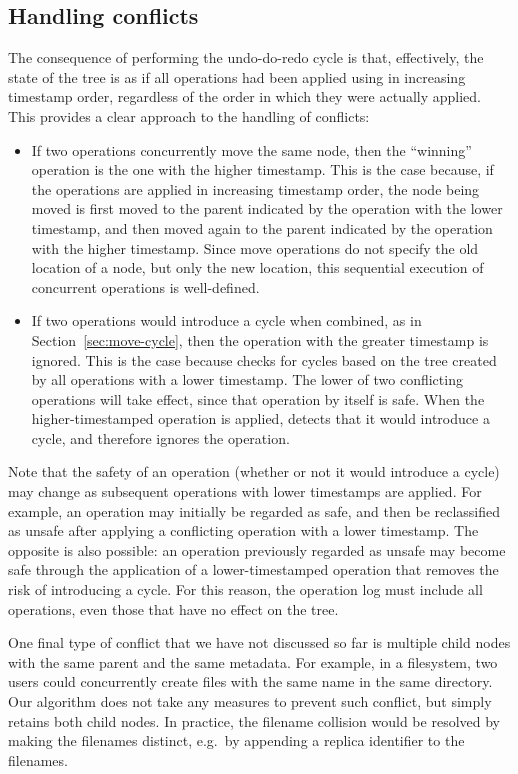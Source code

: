 \documentclass[sigconf]{acmart}
\begin{document}
\subsection{Handling conflicts}\label{sec:conflicts}

The consequence of performing the undo-do-redo cycle is that, effectively, the state of the tree is as if all operations had been applied using  in increasing timestamp order, regardless of the order in which they were actually applied.
This provides a clear approach to the handling of conflicts:
\begin{itemize}
    \item If two operations concurrently move the same node, then the ``winning'' operation is the one with the higher timestamp.
        This is the case because, if the operations are applied in increasing timestamp order, the node being moved is first moved to the parent indicated by the operation with the lower timestamp, and then moved again to the parent indicated by the operation with the higher timestamp.
        Since move operations do not specify the old location of a node, but only the new location, this sequential execution of concurrent operations is well-defined.
    \item If two operations would introduce a cycle when combined, as in Section~\ref{sec:move-cycle}, then the operation with the greater timestamp is ignored.
        This is the case because  checks for cycles based on the tree created by all operations with a lower timestamp.
        The lower of two conflicting operations will take effect, since that operation by itself is safe.
        When the higher-timestamped operation is applied,  detects that it would introduce a cycle, and therefore ignores the operation.
\end{itemize}

Note that the safety of an operation (whether or not it would introduce a cycle) may change as subsequent operations with lower timestamps are applied.
For example, an operation may initially be regarded as safe, and then be reclassified as unsafe after applying a conflicting operation with a lower timestamp.
The opposite is also possible: an operation previously regarded as unsafe may become safe through the application of a lower-timestamped operation that removes the risk of introducing a cycle.
For this reason, the operation log must include all operations, even those that have no effect on the tree.

One final type of conflict that we have not discussed so far is multiple child nodes with the same parent and the same metadata.
For example, in a filesystem, two users could concurrently create files with the same name in the same directory.
Our algorithm does not take any measures to prevent such conflict, but simply retains both child nodes.
In practice, the filename collision would be resolved by making the filenames distinct, e.g.\ by appending a replica identifier to the filenames.
\end{document}
